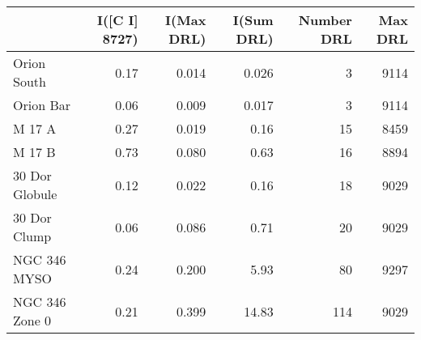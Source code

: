 \begin{tabular}{lrrrrr}
 & I([C I] 8727) & I(Max DRL) & I(Sum DRL) & Number DRL & Max DRL\\
\hline
Orion South & 0.17 & 0.014 & 0.026 & 3 & 9114\\
Orion Bar & 0.06 & 0.009 & 0.017 & 3 & 9114\\
\hline
M 17 A & 0.27 & 0.019 & 0.16 & 15 & 8459\\
M 17 B & 0.73 & 0.080 & 0.63 & 16 & 8894\\
\hline
30 Dor Globule & 0.12 & 0.022 & 0.16 & 18 & 9029\\
30 Dor Clump & 0.06 & 0.086 & 0.71 & 20 & 9029\\
\hline
NGC 346 MYSO & 0.24 & 0.200 & 5.93 & 80 & 9297\\
NGC 346 Zone 0 & 0.21 & 0.399 & 14.83 & 114 & 9029\\
\end{tabular}
